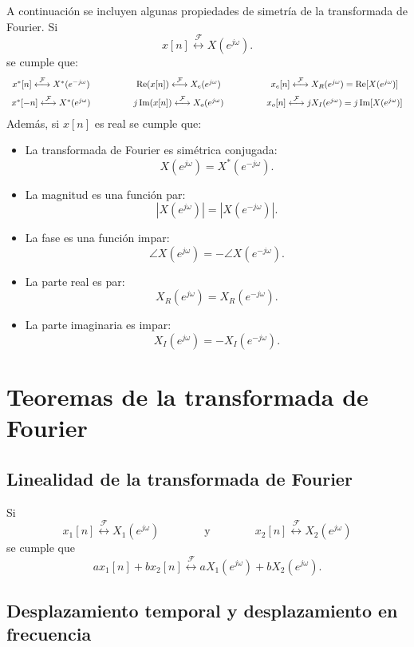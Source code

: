 \documentclass[a4paper]{report}
\renewcommand{\Re}{\operatorname{Re}}
\renewcommand{\Im}{\operatorname{Im}}
\begin{document}
A continuación se incluyen algunas propiedades de simetría de la transformada de Fourier. Si
\[
 x[n]\overset{\mathcal{F}}{\longleftrightarrow}X(e^{j\omega}).
\]
se cumple que:
\[
 \begin{array}{cp{1.0cm}cp{1.0cm}c}
  x^*[n]\overset{\mathcal{F}}{\longleftrightarrow}X^*(e^{-j\omega})&& \Re(x[n])\overset{\mathcal{F}}{\longleftrightarrow}X_e(e^{j\omega})&&x_e[n]\overset{\mathcal{F}}{\longleftrightarrow}X_R(e^{j\omega})=\Re[X(e^{j\omega})]\\[\medskipamount]
  x^*[-n]\overset{\mathcal{F}}{\longleftrightarrow}X^*(e^{j\omega})&&j\Im(x[n])\overset{\mathcal{F}}{\longleftrightarrow}X_o(e^{j\omega})&&x_o[n]\overset{\mathcal{F}}{\longleftrightarrow}jX_I(e^{j\omega})=j\Im[X(e^{j\omega})]
 \end{array}
\]
Además, si \(x[n]\) es real se cumple que:
\begin{itemize}
 \item La transformada de Fourier es simétrica conjugada:
   \[
     X(e^{j\omega})=X^*(e^{-j\omega}).
   \]
 \item La magnitud es una función par:
   \[
    |X(e^{j\omega})|=|X(e^{-j\omega})|.
   \]
 \item La fase es una función impar:
   \[
    \angle X(e^{j\omega})=-\angle X(e^{-j\omega}).
   \] 
 \item La parte real es par:   
  \[
   X_R(e^{j\omega})=X_R(e^{-j\omega}).
  \]
 \item La parte imaginaria es impar:
  \[
    X_I(e^{j\omega})=-X_I(e^{-j\omega}).
  \] 
\end{itemize}

\section{Teoremas de la transformada de Fourier}\label{sec:fourier_transform_theorems}

\subsection{Linealidad de la transformada de Fourier}

Si
\[
  x_1[n]\overset{\mathcal{F}}{\longleftrightarrow}X_1(e^{j\omega})
  \qquad\qquad\textrm{y}\qquad\qquad
  x_2[n]\overset{\mathcal{F}}{\longleftrightarrow}X_2(e^{j\omega})
\]
se cumple que
\[
 ax_1[n]+bx_2[n]\overset{\mathcal{F}}{\longleftrightarrow}aX_1(e^{j\omega})+bX_2(e^{j\omega}).
\]

\subsection{Desplazamiento temporal y desplazamiento en frecuencia}\label{sec:seq_and_sys_dtft_temporal_and freq_shift}
\end{document}

